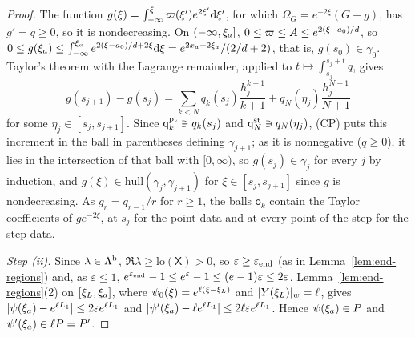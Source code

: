 \begin{proof}
The function $g(\xi)=\int_{-\infty}^\xi\varpi(\xi')e^{2\xi'}\dd\xi'$, for which
$\Omega_G=e^{-2\xi}(G+g)$, has $g'=q\ge0$, so it is
nondecreasing. On $(-\infty,\xi_a]$, $0\le\varpi\le A\le e^{2(\xi-a_0)/d}$, so
$0\le g(\xi_a)\le\int_{-\infty}^{\xi_a}e^{2(\xi-a_0)/d+2\xi}\dd\xi=e^{2x_a+2\xi_a}/(2/d+2)$,
that is, $g(s_0)\in\gamma_0$. Taylor's theorem with the Lagrange remainder,
applied to $t\mapsto\int_{s_j}^{s_j+t}q$, gives
\[
g(s_{j+1})-g(s_j)=\sum_{k<N}q_k(s_j)\frac{h_j^{k+1}}{k+1}+q_N(\eta_j)\frac{h_j^{N+1}}{N+1}
\]
for some $\eta_j\in[s_j,s_{j+1}]$. Since $\mathsf q_k^{\rm pt}\ni q_k(s_j)$ and
$\mathsf q_N^{\rm st}\ni q_N(\eta_j)$, (CP) puts this increment in the ball in
parentheses defining $\gamma_{j+1}$; as it is nonnegative ($q\ge0$), it lies in the
intersection of that ball with $[0,\infty)$, so $g(s_j)\in\gamma_j$ for every $j$ by
induction, and $g(\xi)\in\mathrm{hull}(\gamma_j,\gamma_{j+1})$ for
$\xi\in[s_j,s_{j+1}]$ since $g$ is nondecreasing. As $g_r=q_{r-1}/r$ for $r\ge1$, the
balls $\mathsf o_k$ contain the Taylor coefficients of $ge^{-2\xi}$, at $s_j$ for the
point data and at every point of the step for the step data.

\emph{Step \textup{(ii)}.} Since $\lambda\in\Lambda^{\rm b}$,
$\Re\lambda\ge\mathrm{lo}(\mathsf X)>0$, so $\varepsilon\ge\varepsilon_{\mathrm{end}}$ (as in
Lemma~\ref{lem:end-regions}) and, as $\varepsilon\le1$,
$e^{\varepsilon_{\mathrm{end}}}-1\le e^\varepsilon-1\le(e-1)\varepsilon\le2\varepsilon$.
Lemma~\ref{lem:end-regions}(2) on $[\xi_L,\xi_a]$, where $\psi_0(\xi)=e^{\ell(\xi-\xi_L)}$
and $|Y(\xi_L)|_w=\ell$, gives $|\psi(\xi_a)-e^{\ell L_1}|\le2\varepsilon e^{\ell L_1}$ and
$|\psi'(\xi_a)-\ell e^{\ell L_1}|\le2\ell\varepsilon e^{\ell L_1}$. Hence
$\psi(\xi_a)\in P$ and $\psi'(\xi_a)\in\ell P=P'$.


\end{proof}
